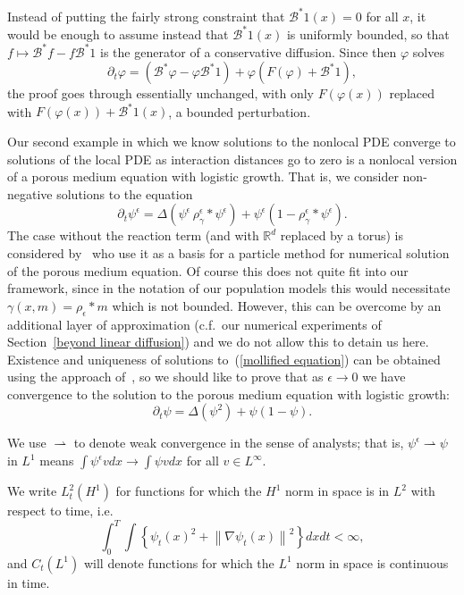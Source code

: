 \documentclass[EJP]{ejpecp} %
\newcommand{\IR}{\mathbb R}
\newcommand{\DG}{\mathcal{B}}  %
\newcommand{\kernel}{\rho}  %
\newcommand{\smooth}[1]{\kernel_{#1} \! * \!}  %
\begin{document}
\begin{remark}
    Instead of putting the fairly strong constraint that $\DG^* 1(x) = 0$ for all $x$,
    it would be enough to assume instead that $\DG^* 1(x)$ is uniformly bounded,
    so that $f \mapsto \DG^*f - f \DG^* 1$ is the generator of a conservative diffusion.
    Since then $\varphi$ solves
    $$ \partial_t \varphi = (\DG^* \varphi - \varphi \DG^* 1) + \varphi (F(\varphi) + \DG^* 1) , $$
    the proof goes through essentially unchanged,
    with only $F(\varphi(x))$ replaced with $F(\varphi(x)) + \DG^*1(x)$,
    a bounded perturbation.
\end{remark}

Our second example 
in which we know solutions to the nonlocal PDE converge to
solutions of the local PDE as interaction distances go to zero
is a nonlocal version of a porous medium equation with logistic growth.
That is, we consider non-negative solutions to the equation
\begin{equation}
\label{mollified equation}
\partial_t \psi^\epsilon=
\Delta\left(\psi^\epsilon \, \rho^{\epsilon}_\gamma*\psi^\epsilon\right)
+\psi^\epsilon\left(1-\rho^{\epsilon}_\gamma*\psi^\epsilon\right).
\end{equation}
The case without the reaction term (and with $\IR^d$ replaced by a torus) is considered 
by~\cite{lions/mas-gallic:2001} who use
it as a basis for a particle method for numerical solution of the porous medium equation.
Of course this does not quite fit into our framework, since in the notation of our 
population models this would necessitate $\gamma(x,m)=\smooth{\epsilon}m$ which is
not bounded. However, this can be overcome by an additional layer of approximation
(c.f.~our numerical experiments of Section~\ref{beyond linear diffusion})
and we do not allow this to detain us here. Existence and uniqueness of solutions 
to~(\ref{mollified equation}) can be obtained using the approach
of~\cite{lions/mas-gallic:2001}, so
we should like to prove that as $\epsilon\to 0$ we have
convergence to the solution to the porous medium equation with
logistic growth:
\begin{equation}
\label{PME}
\partial_t\psi=
\Delta\left(\psi^2\right)
+\psi\left(1-\psi\right).
\end{equation}

\begin{notation}
We use $\rightharpoonup$ to denote weak convergence in the sense of analysts;
that is, $\psi^\epsilon\rightharpoonup \psi$ in $L^1$ means 
$\int \psi^\epsilon v d x
\rightarrow\int \psi v d x$ for all $v\in L^\infty$.

We write $L_t^2(H^1)$ for functions for which the $H^1$ norm in
space is in $L^2$ with respect to time, i.e.
$$\int_0^T\int \left\{\psi_t(x)^2+\left\| \nabla \psi_t(x)\right\|^2\right\}
dx dt <\infty,$$
and $C_t(L^1)$
will denote functions for which the $L^1$ norm in space is continuous in time.
\end{notation}
\end{document}
